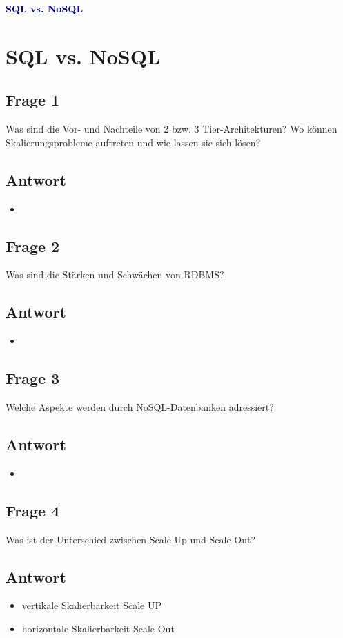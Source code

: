 \textbf{\textcolor{darkblue}{ SQL vs. NoSQL}}~

\section*{SQL vs. NoSQL}
\subsection*{Frage 1}
Was sind die Vor- und Nachteile von 2 bzw. 3 Tier-Architekturen? Wo können Skalierungsprobleme auftreten und wie lassen sie sich lösen?
\subsection*{Antwort}
\begin{itemize}
	\item 
\end{itemize}

\subsection*{Frage 2}
Was sind die Stärken und Schwächen von RDBMS?
\subsection*{Antwort}
\begin{itemize}
	\item 
\end{itemize}

\subsection*{Frage 3}
Welche Aspekte werden durch NoSQL-Datenbanken adressiert?
\subsection*{Antwort}
\begin{itemize}
	\item 
\end{itemize}

\subsection*{Frage 4}
Was ist der Unterschied zwischen Scale-Up und Scale-Out?
\subsection*{Antwort}
\begin{itemize}
	\item vertikale Skalierbarkeit Scale UP
	\item horizontale Skalierbarkeit Scale Out
\end{itemize}

